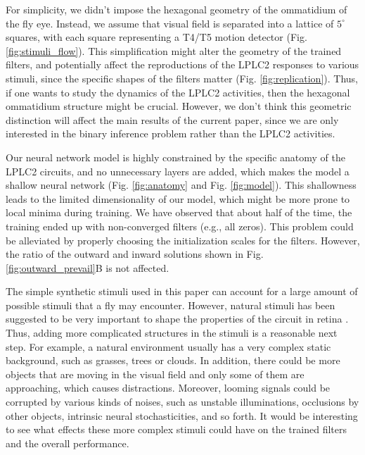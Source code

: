 \documentclass[pdftex,9pt,lineno]{elife}
\begin{document}
For simplicity, we didn't impose the hexagonal geometry of the ommatidium of the fly eye. Instead, we assume that visual field is separated into a lattice of $5^{\circ}$ squares, with each square representing a T4/T5 motion detector (Fig. \ref{fig:stimuli_flow}). This simplification might alter the geometry of the trained filters, and potentially affect the reproductions of the LPLC2 responses to various stimuli, since the specific shapes of the filters matter (Fig. \ref{fig:replication}). Thus, if one wants to study the dynamics of the LPLC2 activities, then the hexagonal ommatidium structure might be crucial. However, we don't think this geometric distinction will affect the main results of the current paper, since we are only interested in the binary inference problem rather than the LPLC2 activities.

Our neural network model is highly constrained by the specific anatomy of the LPLC2 circuits, and no unnecessary layers are added, which makes the model a shallow neural network (Fig. \ref{fig:anatomy} and Fig. \ref{fig:model}). This shallowness leads to the limited dimensionality of our model, which might be more prone to local minima during training. We have observed that about half of the time, the training ended up with non-converged filters (e.g., all zeros). This problem could be alleviated by properly choosing the initialization scales for the filters. However, the ratio of the outward and inward solutions shown in Fig. \ref{fig:outward_prevail}B is not affected.


The simple synthetic stimuli used in this paper can account for a large amount of possible stimuli that a fly may encounter. However, natural stimuli has been suggested to be very important to shape the properties of the circuit in retina \citep{tanaka2019deep}. Thus, adding more complicated structures in the stimuli is a reasonable next step. For example, a natural environment usually has a very complex static background, such as grasses, trees or clouds. In addition, there could be more objects that are moving in the visual field and only some of them are approaching, which causes distractions. Moreover, looming signals could be corrupted by various kinds of noises, such as unstable illuminations, occlusions by other objects, intrinsic neural stochasticities, and so forth. It would be interesting to see what effects these more complex stimuli could have on the trained filters and the overall performance.
\end{document}
